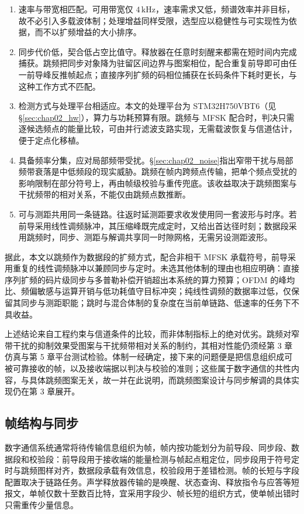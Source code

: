 \begin{enumerate}
  \item 速率与带宽相匹配。可用带宽仅 $4\,\mathrm{kHz}$，速率需求又低，频谱效率并非目标，故不必引入多载波体制；处理增益同样受限，选型应以稳健性与可实现性为依据，而不以扩频增益的大小排序。
  \item 同步代价低，契合低占空比值守。释放器在任意时刻醒来都需在短时间内完成捕获。跳频把同步对象降为驻留区间边界与图案相位，配合重复前导即可由任一前导峰反推帧起点；直接序列扩频的码相位捕获在长码条件下耗时更长，与这种工作方式不匹配。
  \item 检测方式与处理平台相适应。本文的处理平台为 STM32H750VBT6（见 \S\ref{sec:chap02_hw}），算力与功耗预算有限。跳频与 MFSK 配合时，判决只需逐候选频点的能量比较，可由并行滤波支路实现，无需载波恢复与信道估计，便于定点化移植。
  \item 具备频率分集，应对局部频带受扰。\S\ref{sec:chap02_noise}指出窄带干扰与局部频带衰落是中低频段的现实威胁。跳频在帧内跨频点传输，把单个频点受扰的影响限制在部分符号上，再由帧级校验与重传兜底。该收益取决于跳频图案与干扰频带的相对关系，不能仅由跳频点数推断。
  \item 可与测距共用同一条链路。往返时延测距要求收发使用同一套波形与时序。若前导采用线性调频脉冲，其压缩峰既完成定时，又给出首达径时刻；数据段采用跳频时，同步、测距与解调共享同一时隙网格，无需另设测距波形。
\end{enumerate}

据此，本文以跳频作为数据段的扩频方式，配合非相干 MFSK 承载符号，前导采用重复的线性调频脉冲以兼顾同步与定时。未选其他体制的理由也相应明确：直接序列扩频的码片级同步与多普勒补偿开销超出本系统的算力预算；OFDM 的峰均比、频偏敏感与运算开销与低功耗值守目标冲突；纯线性调频的数据率过低，仅保留其同步与测距职能；跳时与混合体制的复杂度在当前单链路、低速率的任务下不具收益。

上述结论来自工程约束与信道条件的比较，而非体制指标上的绝对优劣。跳频对窄带干扰的抑制效果受图案与干扰频带相对关系的制约，其相对性能仍须经第 3 章仿真与第 5 章平台测试检验。体制一经确定，接下来的问题便是把信息组织成可被可靠接收的帧，以及接收端据以判决与校验的准则；这些属于数字通信的共性内容，与具体跳频图案无关，故一并在此说明，而跳频图案设计与同步解调的具体实现仍在第 3 章展开。

\subsection{帧结构与同步}
\label{sec:chap02_frame}

数字通信系统通常将待传输信息组织为帧，帧内按功能划分为前导段、同步段、数据段和校验段：前导段用于接收端的能量检测与帧起点粗定位，同步段用于符号定时与跳频图样对齐，数据段承载有效信息，校验段用于差错检测。帧的长短与字段配置取决于链路任务。声学释放器传输的是唤醒、状态查询、释放指令与应答等短报文，单帧仅数十至数百比特，宜采用字段少、帧长短的组织方式，使单帧出错时只需重传少量信息。

